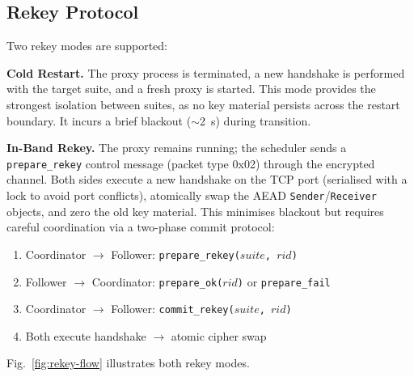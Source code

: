 \documentclass[conference]{IEEEtran}
\begin{document}
\subsection{Rekey Protocol}

Two rekey modes are supported:

\textbf{Cold Restart.}
The proxy process is terminated, a new handshake is performed with the target suite, and a fresh proxy is started.
This mode provides the strongest isolation between suites, as no key material persists across the restart boundary.
It incurs a brief blackout ($\sim$\SI{2}{\second}) during transition.

\textbf{In-Band Rekey.}
The proxy remains running; the scheduler sends a \texttt{prepare\_rekey} control message (packet type 0x02) through the encrypted channel.
Both sides execute a new handshake on the TCP port (serialised with a lock to avoid port conflicts), atomically swap the AEAD \texttt{Sender}/\texttt{Receiver} objects, and zero the old key material.
This minimises blackout but requires careful coordination via a two-phase commit protocol:

\begin{enumerate}[noitemsep]
    \item Coordinator $\to$ Follower: \texttt{prepare\_rekey($\mathit{suite}$, $\mathit{rid}$)}
    \item Follower $\to$ Coordinator: \texttt{prepare\_ok($\mathit{rid}$)} or \texttt{prepare\_fail}
    \item Coordinator $\to$ Follower: \texttt{commit\_rekey($\mathit{suite}$, $\mathit{rid}$)}
    \item Both execute handshake $\to$ atomic cipher swap
\end{enumerate}

Fig.~\ref{fig:rekey-flow} illustrates both rekey modes.
\end{document}
